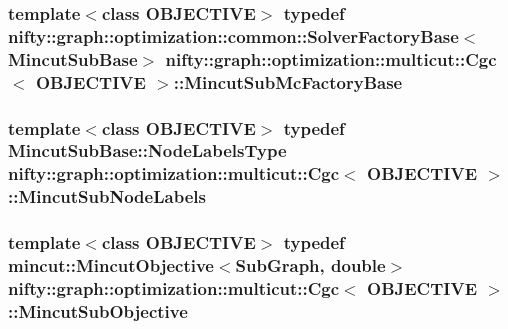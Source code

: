 \subsubsection[{Mincut\+Sub\+Mc\+Factory\+Base}]{\setlength{\rightskip}{0pt plus 5cm}template$<$class O\+B\+J\+E\+C\+T\+I\+V\+E$>$ typedef {\bf nifty\+::graph\+::optimization\+::common\+::\+Solver\+Factory\+Base}$<${\bf Mincut\+Sub\+Base}$>$ {\bf nifty\+::graph\+::optimization\+::multicut\+::\+Cgc}$<$ O\+B\+J\+E\+C\+T\+I\+V\+E $>$\+::{\bf Mincut\+Sub\+Mc\+Factory\+Base}}\label{classnifty_1_1graph_1_1optimization_1_1multicut_1_1Cgc_a104f55e83ebbaf6451d0260210f0c7dc}
\hypertarget{classnifty_1_1graph_1_1optimization_1_1multicut_1_1Cgc_a068e52c9f641116d85685d4ce70f418b}{}
\subsubsection[{Mincut\+Sub\+Node\+Labels}]{\setlength{\rightskip}{0pt plus 5cm}template$<$class O\+B\+J\+E\+C\+T\+I\+V\+E$>$ typedef {\bf Mincut\+Sub\+Base\+::\+Node\+Labels\+Type} {\bf nifty\+::graph\+::optimization\+::multicut\+::\+Cgc}$<$ O\+B\+J\+E\+C\+T\+I\+V\+E $>$\+::{\bf Mincut\+Sub\+Node\+Labels}}\label{classnifty_1_1graph_1_1optimization_1_1multicut_1_1Cgc_a068e52c9f641116d85685d4ce70f418b}
\hypertarget{classnifty_1_1graph_1_1optimization_1_1multicut_1_1Cgc_a3a662b7fd59d4ba56da98b359c47d63c}{}
\subsubsection[{Mincut\+Sub\+Objective}]{\setlength{\rightskip}{0pt plus 5cm}template$<$class O\+B\+J\+E\+C\+T\+I\+V\+E$>$ typedef {\bf mincut\+::\+Mincut\+Objective}$<${\bf Sub\+Graph}, double$>$ {\bf nifty\+::graph\+::optimization\+::multicut\+::\+Cgc}$<$ O\+B\+J\+E\+C\+T\+I\+V\+E $>$\+::{\bf Mincut\+Sub\+Objective}}\label{classnifty_1_1graph_1_1optimization_1_1multicut_1_1Cgc_a3a662b7fd59d4ba56da98b359c47d63c}
\hypertarget{classnifty_1_1graph_1_1optimization_1_1multicut_1_1Cgc_a9bd82569e6729554ef0a07ad57f2bd94}{}
